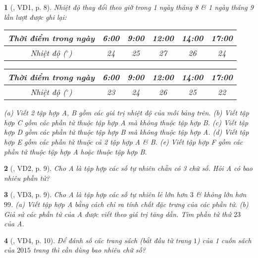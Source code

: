 \documentclass{article}
\newtheorem{baitoan}{}
\begin{document}
\begin{baitoan}[\cite{Binh_boi_duong_Toan_6_tap_1}, VD1, p. 8]
	Nhiệt độ thay đổi theo giờ trong 1 ngày tháng 8 \& 1 ngày tháng 9 lần lượt được ghi lại:
	\begin{table}[H]
		\centering
		\begin{tabular}{|c|c|c|c|c|c|}
			\hline
			Thời điểm trong ngày & 6:00 & 9:00 & 12:00 & 14:00 & 17:00 \\
			\hline
			Nhiệt độ (${}^\circ$) & 24 & 25 & 27 & 26 & 24 \\
			\hline
		\end{tabular}
	\end{table}
	\begin{table}[H]
		\centering
		\begin{tabular}{|c|c|c|c|c|c|}
			\hline
			Thời điểm trong ngày & 6:00 & 9:00 & 12:00 & 14:00 & 17:00 \\
			\hline
			Nhiệt độ (${}^\circ$) & 23 & 24 & 26 & 25 & 22 \\
			\hline
		\end{tabular}
	\end{table}
	\noindent(a) Viết 2 tập hợp A, B gồm các giá trị nhiệt độ của mỗi bảng trên. (b) Viết tập hợp C gồm các phần tử thuộc tập hợp A mà không thuộc tập hợp B. (c) Viết tập hợp D gồm các phần tử thuộc tập hợp B mà không thuộc tập hợp A. (d) Viết tập hợp E gồm các phần tử thuộc cả 2 tập hợp A \& B. (e) Viết tập hợp F gồm các phần tử thuộc tập hợp A hoặc thuộc tập hợp B.
\end{baitoan}

\begin{baitoan}[\cite{Binh_boi_duong_Toan_6_tap_1}, VD2, p. 9]
	Cho A là tập hợp các số tự nhiên chẵn có 3 chữ số. Hỏi A có bao nhiêu phần tử?
\end{baitoan}

\begin{baitoan}[\cite{Binh_boi_duong_Toan_6_tap_1}, VD3, p. 9]
	Cho A là tập hợp các số tự nhiên lẻ lớn hơn $3$ \& không lớn hơn $99$. (a) Viết tập hợp A bằng cách chỉ ra tính chất đặc trưng của các phần tử. (b) Giả sử các phần tử của A được viết theo giá trị tăng dần. Tìm phần tử thứ $23$ của A.
\end{baitoan}

\begin{baitoan}[\cite{Binh_boi_duong_Toan_6_tap_1}, VD4, p. 10]
	Để đánh số các trang sách (bắt đầu từ trang $1$) của 1 cuốn sách của $2015$ trang thì cần dùng bao nhiêu chữ số?
\end{baitoan}
\end{document}
